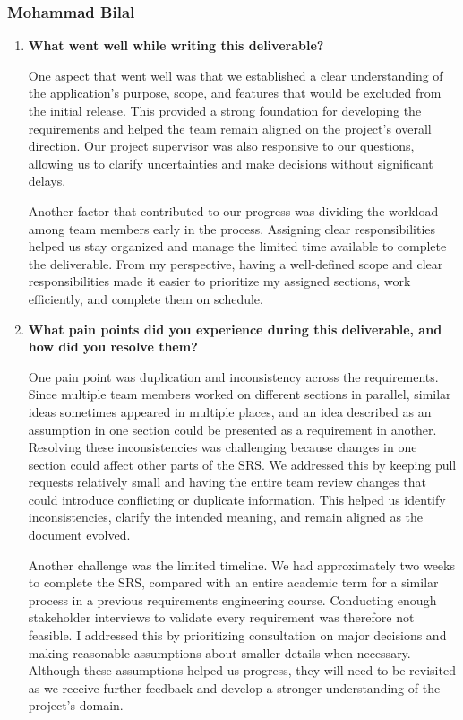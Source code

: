 \documentclass[12pt]{article}
\begin{document}
\subsubsection*{Mohammad Bilal}

\begin{enumerate}
    \item \textbf{What went well while writing this deliverable?}

    One aspect that went well was that we established a clear understanding
    of the application's purpose, scope, and features that would be excluded
    from the initial release. This provided a strong foundation for developing
    the requirements and helped the team remain aligned on the project's
    overall direction. Our project supervisor was also responsive to our
    questions, allowing us to clarify uncertainties and make decisions without
    significant delays.

    Another factor that contributed to our progress was dividing the workload
    among team members early in the process. Assigning clear responsibilities
    helped us stay organized and manage the limited time available to complete
    the deliverable. From my perspective, having a well-defined scope and clear
    responsibilities made it easier to prioritize my assigned sections, work
    efficiently, and complete them on schedule.

    \item \textbf{What pain points did you experience during this
    deliverable, and how did you resolve them?}

    One pain point was duplication and inconsistency across the
    requirements. Since multiple team members worked on different
    sections in parallel, similar ideas sometimes appeared in multiple
    places, and an idea described as an assumption in one section
    could be presented as a requirement in another. Resolving these
    inconsistencies was challenging because changes in one section
    could affect other parts of the SRS. We addressed this by keeping
    pull requests relatively small and
    having the entire team review changes that could introduce
    conflicting or duplicate information. This helped us identify
    inconsistencies, clarify the intended meaning, and remain aligned
    as the document evolved.

    Another challenge was the limited timeline. We had approximately
    two weeks to complete the SRS, compared with an entire academic
    term for a similar process in a previous requirements engineering
    course. Conducting enough stakeholder interviews to validate
    every requirement was therefore not feasible. I addressed this
    by prioritizing consultation on major decisions and making
    reasonable assumptions about smaller details when necessary.
    Although these assumptions helped us progress, they will need
    to be revisited as we receive further feedback and develop a
    stronger understanding of the project's domain.


\end{enumerate}
\end{document}

